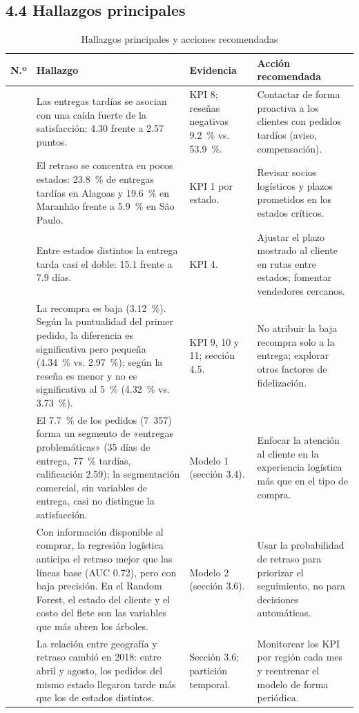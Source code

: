 \documentclass[a4paper,stu,12pt,donotrepeattitle,floatsintext]{apa7}
\begin{document}
\subsection{4.4 Hallazgos principales}
{\footnotesize
\begin{longtable}{|>{\raggedright\arraybackslash}p{}|>{\raggedright\arraybackslash}p{}|>{\raggedright\arraybackslash}p{}|>{\raggedright\arraybackslash}p{}|}
\caption{Hallazgos principales y acciones recomendadas}\\
\hline
\textbf{N.º} & \textbf{Hallazgo} & \textbf{Evidencia} & \textbf{Acción recomendada} \\ \hline
\endhead
1 & Las entregas tardías se asocian con una caída fuerte de la satisfacción: 4.30 frente a 2.57 puntos. & KPI 8; reseñas negativas 9.2~\% vs. 53.9~\%. & Contactar de forma proactiva a los clientes con pedidos tardíos (aviso, compensación). \\ \hline
2 & El retraso se concentra en pocos estados: 23.8~\% de entregas tardías en Alagoas y 19.6~\% en Maranhão frente a 5.9~\% en São Paulo. & KPI 1 por estado. & Revisar socios logísticos y plazos prometidos en los estados críticos. \\ \hline
3 & Entre estados distintos la entrega tarda casi el doble: 15.1 frente a 7.9 días. & KPI 4. & Ajustar el plazo mostrado al cliente en rutas entre estados; fomentar vendedores cercanos. \\ \hline
4 & La recompra es baja (3.12~\%). Según la puntualidad del primer pedido, la diferencia es significativa pero pequeña (4.34~\% vs. 2.97~\%); según la reseña es menor y no es significativa al 5~\% (4.32~\% vs. 3.73~\%). & KPI 9, 10 y 11; sección 4.5. & No atribuir la baja recompra solo a la entrega; explorar otros factores de fidelización. \\ \hline
5 & El 7.7~\% de los pedidos (7~357) forma un segmento de «entregas problemáticas» (35 días de entrega, 77~\% tardías, calificación 2.59); la segmentación comercial, sin variables de entrega, casi no distingue la satisfacción. & Modelo 1 (sección 3.4). & Enfocar la atención al cliente en la experiencia logística más que en el tipo de compra. \\ \hline
6 & Con información disponible al comprar, la regresión logística anticipa el retraso mejor que las líneas base (AUC 0.72), pero con baja precisión. En el Random Forest, el estado del cliente y el costo del flete son las variables que más abren los árboles. & Modelo 2 (sección 3.6). & Usar la probabilidad de retraso para priorizar el seguimiento, no para decisiones automáticas. \\ \hline
7 & La relación entre geografía y retraso cambió en 2018: entre abril y agosto, los pedidos del mismo estado llegaron tarde más que los de estados distintos. & Sección 3.6; partición temporal. & Monitorear los KPI por región cada mes y reentrenar el modelo de forma periódica. \\ \hline
\end{longtable}
}
\end{document}
